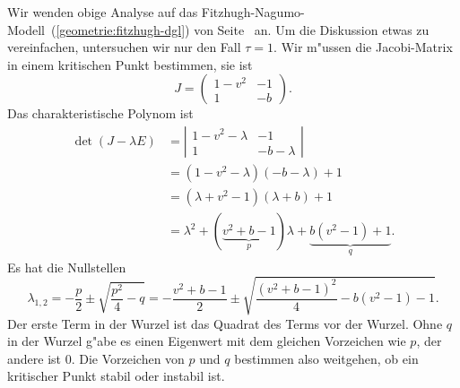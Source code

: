 \begin{beispiel}
\label{geometrie:fh-fortsetzung}
Wir wenden obige Analyse auf das
Fitzhugh-Nagumo-Modell~(\ref{geometrie:fitzhugh-dgl}) von
Seite~\pageref{geometrie:fitzhugh-dgl} an.
Um die Diskussion etwas zu vereinfachen, untersuchen wir nur den Fall
$\tau = 1$.
Wir m"ussen die Jacobi-Matrix in einem kritischen Punkt bestimmen, sie ist
\begin{equation}
J=
\begin{pmatrix}
1-v^2 &  -1 \\
  1   &  -b
\end{pmatrix}.
\end{equation}
Das charakteristische Polynom ist
\begin{align*}
\det(J-\lambda E)
&=
\left|
\begin{matrix}
1-v^2-\lambda&-1\\
1&-b-\lambda
\end{matrix}
\right|
\\
&=
(1-v^2-\lambda)(-b-\lambda)+1
\\
&=
(\lambda+v^2-1)(\lambda+b)+1
\\
&=
\lambda^2 + (\underbrace{v^2 + b - 1}_{\textstyle p})\lambda
+ \underbrace{b(v^2 - 1)+1}_{\textstyle q}.
\end{align*}
Es hat die Nullstellen
\begin{equation}
\lambda_{1,2}
=
-\frac{p}{2}\pm\sqrt{\frac{p^2}4-q}
=
-\frac{v^2+b-1}2\pm\sqrt{\frac{(v^2+b-1)^2}4-b(v^2-1)-1}.
\label{geometrie:fn-eigenwerte}
\end{equation}
Der erste Term in der Wurzel ist das Quadrat des Terms vor der Wurzel.
Ohne $q$ in der Wurzel g"abe es einen Eigenwert mit dem gleichen Vorzeichen
wie $p$, der andere ist $0$.
Die Vorzeichen von $p$ und $q$ bestimmen also weitgehen, ob ein 
kritischer Punkt stabil oder instabil ist.


\end{beispiel}
